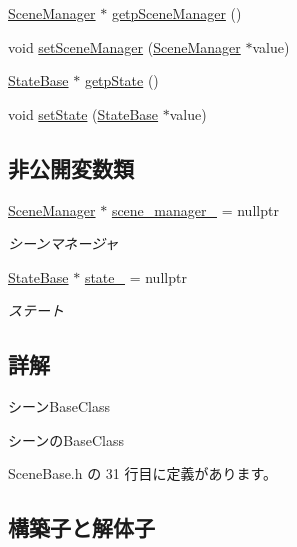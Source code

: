 \begin{DoxyCompactItemize}
\mbox{\hyperlink{class_scene_manager}{Scene\+Manager}} $\ast$ \mbox{\hyperlink{class_scene_base_aa5086973ccaf3d07e4ee9d1fc940e209}{getp\+Scene\+Manager}} ()
\item 
void \mbox{\hyperlink{class_scene_base_aae1930cae97c27ee7d54b4bd8896a515}{set\+Scene\+Manager}} (\mbox{\hyperlink{class_scene_manager}{Scene\+Manager}} $\ast$value)
\item 
\mbox{\hyperlink{class_scene_base_1_1_state_base}{State\+Base}} $\ast$ \mbox{\hyperlink{class_scene_base_a9ee8fb94a520c570663ea7ab223e7218}{getp\+State}} ()
\item 
void \mbox{\hyperlink{class_scene_base_a95d33774db6a05cf1e9da201720ea3db}{set\+State}} (\mbox{\hyperlink{class_scene_base_1_1_state_base}{State\+Base}} $\ast$value)
\end{DoxyCompactItemize}
\subsection*{非公開変数類}
\begin{DoxyCompactItemize}
\item 
\mbox{\hyperlink{class_scene_manager}{Scene\+Manager}} $\ast$ \mbox{\hyperlink{class_scene_base_af9f693449ce2472d28f692bd64d5c2ef}{scene\+\_\+manager\+\_\+}} = nullptr
\begin{DoxyCompactList}\small\item\em シーンマネージャ \end{DoxyCompactList}\item 
\mbox{\hyperlink{class_scene_base_1_1_state_base}{State\+Base}} $\ast$ \mbox{\hyperlink{class_scene_base_a9d8b7237f492e9ce0724714393b0e881}{state\+\_\+}} = nullptr
\begin{DoxyCompactList}\small\item\em ステート \end{DoxyCompactList}\end{DoxyCompactItemize}


\subsection{詳解}
シーン\+Base\+Class 

シーンの\+Base\+Class 

 Scene\+Base.\+h の 31 行目に定義があります。



\subsection{構築子と解体子}
\mbox{\label{class_scene_base_aeafd60485ad8b2191f40da3013d50f2c}} 
